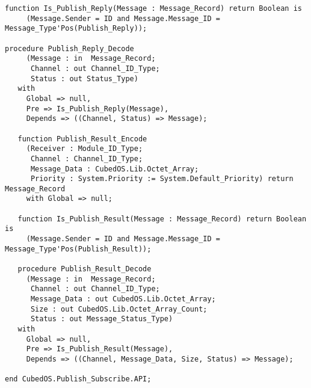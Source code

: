 \begin{itemize}
\begin{verbatim}
function Is_Publish_Reply(Message : Message_Record) return Boolean is
     (Message.Sender = ID and Message.Message_ID = Message_Type'Pos(Publish_Reply));

procedure Publish_Reply_Decode
     (Message : in  Message_Record;
      Channel : out Channel_ID_Type;
      Status : out Status_Type)
   with
     Global => null,
     Pre => Is_Publish_Reply(Message),
     Depends => ((Channel, Status) => Message);

   function Publish_Result_Encode
     (Receiver : Module_ID_Type;
      Channel : Channel_ID_Type;
      Message_Data : CubedOS.Lib.Octet_Array;
      Priority : System.Priority := System.Default_Priority) return Message_Record
     with Global => null;

   function Is_Publish_Result(Message : Message_Record) return Boolean is
     (Message.Sender = ID and Message.Message_ID = Message_Type'Pos(Publish_Result));

   procedure Publish_Result_Decode
     (Message : in  Message_Record;
      Channel : out Channel_ID_Type;
      Message_Data : out CubedOS.Lib.Octet_Array;
      Size : out CubedOS.Lib.Octet_Array_Count;
      Status : out Message_Status_Type)
   with
     Global => null,
     Pre => Is_Publish_Result(Message),
     Depends => ((Channel, Message_Data, Size, Status) => Message);

end CubedOS.Publish_Subscribe.API;
\end{verbatim}
  
\end{itemize}
